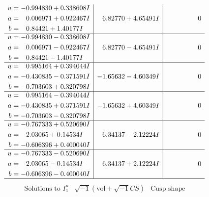 \documentclass[1p]{elsarticle_modified}
\theoremstyle{definition}
\newcommand{\I}{\sqrt{-1}}
\begin{document}
$$\begin{array}{c|c|c}
\begin{aligned}
u &= -0.994830 + 0.338608 I \\
a &= \phantom{-}0.006971 + 0.922467 I \\
b &= \phantom{-}0.84421 + 1.40177 I\end{aligned}
 & \phantom{-}6.82770 + 4.65491 I & \phantom{-0.000000 } 0 \\ \hline\begin{aligned}
u &= -0.994830 - 0.338608 I \\
a &= \phantom{-}0.006971 - 0.922467 I \\
b &= \phantom{-}0.84421 - 1.40177 I\end{aligned}
 & \phantom{-}6.82770 - 4.65491 I & \phantom{-0.000000 } 0 \\ \hline\begin{aligned}
u &= \phantom{-}0.995164 + 0.394044 I \\
a &= -0.430835 - 0.371591 I \\
b &= -0.703603 + 0.320798 I\end{aligned}
 & -1.65632 - 4.60349 I & \phantom{-0.000000 } 0 \\ \hline\begin{aligned}
u &= \phantom{-}0.995164 - 0.394044 I \\
a &= -0.430835 + 0.371591 I \\
b &= -0.703603 - 0.320798 I\end{aligned}
 & -1.65632 + 4.60349 I & \phantom{-0.000000 } 0 \\ \hline\begin{aligned}
u &= -0.767333 + 0.520690 I \\
a &= \phantom{-}2.03065 + 0.14534 I \\
b &= -0.606396 + 0.400040 I\end{aligned}
 & \phantom{-}6.34137 - 2.12224 I & \phantom{-0.000000 } 0 \\ \hline\begin{aligned}
u &= -0.767333 - 0.520690 I \\
a &= \phantom{-}2.03065 - 0.14534 I \\
b &= -0.606396 - 0.400040 I\end{aligned}
 & \phantom{-}6.34137 + 2.12224 I & \phantom{-0.000000 } 0\\
 \hline 
 \end{array}$$\newpage$$\begin{array}{c|c|c}  
\text{Solutions to }I^u_{1}& \I (\text{vol} + \sqrt{-1}CS) & \text{Cusp shape}\\
 \hline 
\begin{aligned}

\end{aligned}
\end{array}$$
\end{document}
